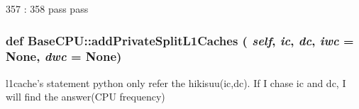 \begin{DoxyCode}
357                            :
358         pass
        pass
\end{DoxyCode}
\hypertarget{namespaceBaseCPU_a6a3b2194b3d12de8cec0a3b63a527ac5}{
\subsubsection[{addPrivateSplitL1Caches}]{\setlength{\rightskip}{0pt plus 5cm}def BaseCPU::addPrivateSplitL1Caches ( {\em self}, \/   {\em ic}, \/   {\em dc}, \/   {\em iwc} = {\ttfamily None}, \/   {\em dwc} = {\ttfamily None})}}
\label{namespaceBaseCPU_a6a3b2194b3d12de8cec0a3b63a527ac5}


l1cache's statement python only refer the hikisuu(ic,dc). If I chase ic and dc, I will find the answer(CPU frequency) 


